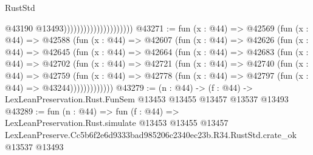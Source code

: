 \begin{lexlean}{RustStd}
\begin{coremodule}
                                              @43190
                                              @13493)))))))))))))))))))))
@43271 := fun (x : @44) =>
  @42569
    (fun (x : @44) =>
    @42588
      (fun (x : @44) =>
      @42607
        (fun (x : @44) =>
        @42626
          (fun (x : @44) =>
          @42645
            (fun (x : @44) =>
            @42664
              (fun (x : @44) =>
              @42683
                (fun (x : @44) =>
                @42702
                  (fun (x : @44) =>
                  @42721
                    (fun (x : @44) =>
                    @42740
                      (fun (x : @44) =>
                      @42759
                        (fun (x : @44) =>
                        @42778 (fun (x : @44) => @42797 (fun (x : @44) => @43244)))))))))))))
@43279 := (n : @44) ->
  (f : @44) -> LexLeanPreservation.Rust.FunSem @13453 @13455 @13457 @13537 @13493
@43289 := fun (n : @44) =>
  fun (f : @44) =>
  LexLeanPreservation.Rust.simulate
    @13453
    @13455
    @13457
    LexLeanPreserve.Cc5b6f2e6d9333bad985206c2340ec23b.R34.RustStd.crate_ok
    @13537
    @13493
\end{coremodule}
\end{lexlean}

